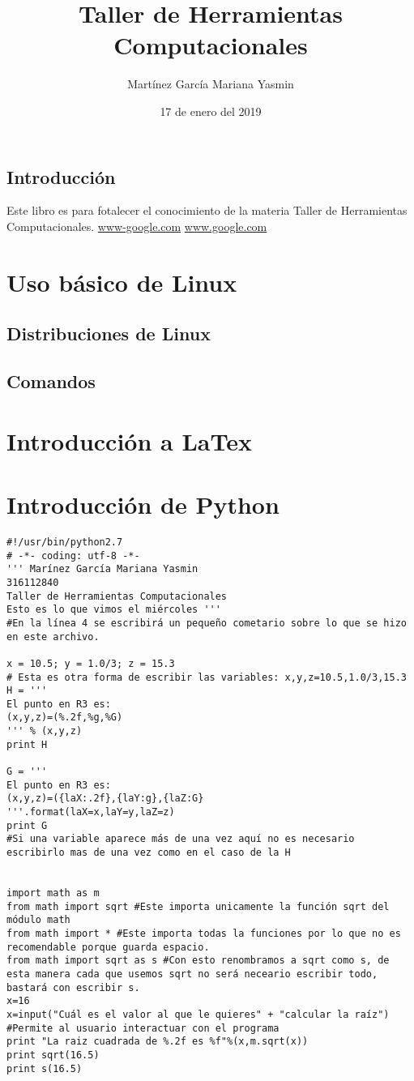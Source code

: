 \documentclass{book}
\title{Taller de Herramientas Computacionales}
\author{Martínez García Mariana Yasmin}
\date{17 de enero del 2019}
\begin{document}
\maketitle
\tableofcontents
\section*{Introducción}  Este libro es para fotalecer el conocimiento de la materia Taller de Herramientas Computacionales.
\url{www-google.com}
\hyperref[Google]{www.google.com}

\chapter{Uso básico de Linux}
\section{Distribuciones de Linux}
\section{Comandos}
\chapter{Introducción a LaTex}
\chapter{Introducción de Python}
\begin{verbatim}
#!/usr/bin/python2.7
# -*- coding: utf-8 -*-
''' Marínez García Mariana Yasmin
316112840
Taller de Herramientas Computacionales
Esto es lo que vimos el miércoles '''
#En la línea 4 se escribirá un pequeño cometario sobre lo que se hizo en este archivo.

x = 10.5; y = 1.0/3; z = 15.3
# Esta es otra forma de escribir las variables: x,y,z=10.5,1.0/3,15.3
H = '''
El punto en R3 es:
(x,y,z)=(%.2f,%g,%G)
''' % (x,y,z)
print H

G = '''
El punto en R3 es:
(x,y,z)=({laX:.2f},{laY:g},{laZ:G}
'''.format(laX=x,laY=y,laZ=z)
print G
#Si una variable aparece más de una vez aquí no es necesario escribirlo mas de una vez como en el caso de la H


import math as m
from math import sqrt #Este importa unicamente la función sqrt del módulo math
from math import * #Este importa todas la funciones por lo que no es recomendable porque guarda espacio.
from math import sqrt as s #Con esto renombramos a sqrt como s, de esta manera cada que usemos sqrt no será neceario escribir todo, bastará con escribir s.
x=16
x=input("Cuál es el valor al que le quieres" + "calcular la raíz") #Permite al usuario interactuar con el programa
print "La raiz cuadrada de %.2f es %f"%(x,m.sqrt(x))
print sqrt(16.5)
print s(16.5)
\end{verbatim}
 \\
\end{document}
